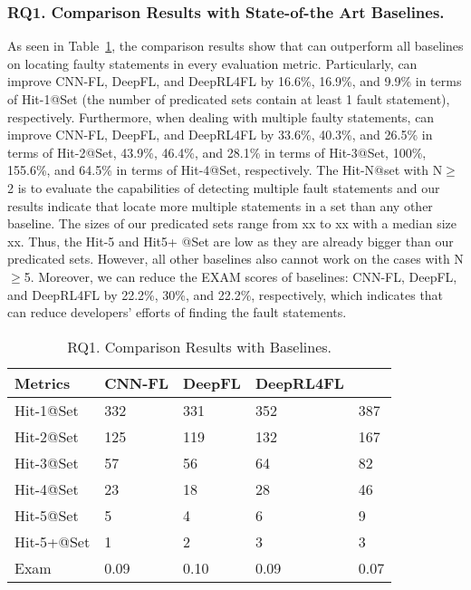 \subsubsection{\bf RQ1. Comparison Results with State-of-the Art Baselines.}

As seen in Table~\ref{fig:rq1-0}, 
the comparison results show that {\tool} can outperform all baselines on locating faulty statements in every evaluation metric. Particularly, {\tool} can improve CNN-FL, DeepFL, and DeepRL4FL by 16.6\%, 16.9\%, and 9.9\% in terms of Hit-1@Set (the number of predicated sets contain at least 1 fault statement), respectively. Furthermore, when dealing with multiple faulty statements, {\tool} can improve CNN-FL, DeepFL, and DeepRL4FL by 33.6\%, 40.3\%, and 26.5\% in terms of Hit-2@Set, 43.9\%, 46.4\%, and 28.1\% in terms of Hit-3@Set, 100\%, 155.6\%, and 64.5\% in terms of Hit-4@Set, respectively. The Hit-N@set with N$\geq$2 is to evaluate the capabilities of detecting multiple fault statements and our results indicate that {\tool} locate more multiple statements in a set than any other baseline. The sizes of our predicated sets range from xx to xx with a median size xx. Thus, the Hit-5 and Hit5+ @Set are low as they are already bigger than our predicated sets. However, all other baselines also cannot work on the cases with N$\geq$5. Moreover, we can reduce the EXAM scores of baselines: CNN-FL, DeepFL, and DeepRL4FL by 22.2\%, 30\%, and 22.2\%, respectively, which indicates that {\tool} can reduce developers' efforts of finding the fault statements.

\begin{table}[t]
	\caption{RQ1. Comparison Results with Baselines.}
	{\small
		\begin{center}
			\renewcommand{\arraystretch}{1}
				\begin{tabular}{p{1.5cm}<{\centering}|p{1cm}<{\centering}|p{0.8cm}<{\centering}|p{1.2cm}<{\centering}|p{1.2cm}<{\centering}}
				\hline
				Metrics & CNN-FL & DeepFL & DeepRL4FL & \tool \\			
				\hline
				Hit-1@Set   & 332 & 331 & 352 & 387 \\
				Hit-2@Set	& 125 & 119 & 132 & 167 \\
				Hit-3@Set	& 57 & 56 & 64 & 82 \\
				Hit-4@Set	& 23 & 18 & 28 & 46 \\
				Hit-5@Set	& 5 & 4 & 6 & 9 \\
				Hit-5+@Set	& 1 & 2 & 3 & 3 \\
				Exam     	& 0.09 & 0.10 & 0.09 & 0.07 \\
				\hline
			\end{tabular}
			
			\label{fig:rq1-0}
		\end{center}
	}
\end{table}

